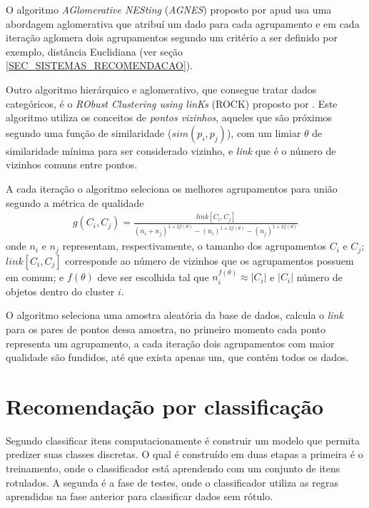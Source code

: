 O algoritmo \emph{AGlomerative NESting} (\emph{AGNES}) proposto por  apud  usa uma abordagem aglomerativa que atribuí um dado para cada agrupamento e em cada iteração aglomera dois agrupamentos segundo um critério a ser definido por exemplo, distância Euclidiana (ver seção \ref{SEC_SISTEMAS_RECOMENDACAO}).

Outro algoritmo hierárquico e aglomerativo, que consegue tratar dados categóricos, é o \emph{RObust Clustering using linKs} (ROCK) proposto por . Este algoritmo utiliza os conceitos de \emph{pontos vizinhos}, aqueles que são próximos segundo uma função de similaridade (\(sim(p_{i}, p_{j})\)), com um limiar \(\theta\) de similaridade mínima para ser considerado vizinho, e \emph{link} que é o número de vizinhos comuns entre pontos.

A cada iteração o algoritmo seleciona os melhores agrupamentos para união segundo a métrica de qualidade
\begin{align}
g(C_{i}, C_{j}) = \frac{link[C_{i}, C_{j}]}{(n_{i}+n_{j})^{1+2f(\theta)}-(n_{i})^{1+2f(\theta)}-(n_{j})^{1+2f(\theta)}}
\end{align}
onde \(n_{i}\) e \(n_{j}\) representam, respectivamente, o tamanho dos agrupamentos \(C_{i}\) e \(C_{j}\); \(link[C_{i}, C_{j}]\) corresponde ao número de vizinhos que os agrupamentos possuem em comum; e \(f(\theta)\) deve ser escolhida tal que \(n_{i}^{f(\theta)} \approx |C_{i}|\) e \(|C_{i}|\) número de objetos dentro do cluster \(i\).

O algoritmo seleciona uma amostra aleatória da base de dados, calcula o \emph{link} para os pares de pontos dessa amostra, no primeiro momento cada ponto representa um agrupamento, a cada iteração dois agrupamentos com maior qualidade são fundidos, até que exista apenas um, que contém todos os dados.

\section{Recomendação por classificação}\label{SEC_RECOMENDACAO_CLASSIFICACAO}
Segundo  classificar itens computacionamente é construir um modelo que permita predizer suas classes discretas. O qual é construído em duas etapas a primeira é o treinamento, onde o classificador está aprendendo com um conjunto de itens rotulados. A segunda é a fase de testes, onde o classificador utiliza as regras aprendidas na fase anterior para classificar dados sem rótulo.

